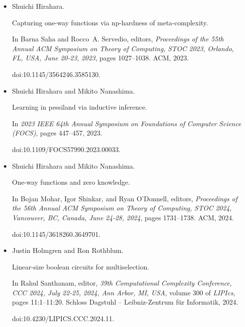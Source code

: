 \begin{itemize}
doi:10.1109/FOCS54457.2022.00095.





\item[] 
[17]

Shuichi Hirahara.


Capturing one-way functions via np-hardness of meta-complexity.


In Barna Saha and Rocco A. Servedio, editors, \emph{Proceedings of the
55th Annual ACM Symposium on Theory of Computing, STOC 2023, Orlando, FL,
USA, June 20-23, 2023}, pages 1027–1038. ACM, 2023.


doi:10.1145/3564246.3585130.





\item[] 
[18]

Shuichi Hirahara and Mikito Nanashima.


Learning in pessiland via inductive inference.


In \emph{2023 IEEE 64th Annual Symposium on Foundations of Computer
Science (FOCS)}, pages 447–457, 2023.


doi:10.1109/FOCS57990.2023.00033.





\item[] 
[19]

Shuichi Hirahara and Mikito Nanashima.


One-way functions and zero knowledge.


In Bojan Mohar, Igor Shinkar, and Ryan O’Donnell, editors, \emph{Proceedings of the 56th Annual ACM Symposium on Theory of Computing, STOC
2024, Vancouver, BC, Canada, June 24-28, 2024}, pages 1731–1738. ACM,
2024.


doi:10.1145/3618260.3649701.





\item[] 
[20]

Justin Holmgren and Ron Rothblum.


Linear-size boolean circuits for multiselection.


In Rahul Santhanam, editor, \emph{39th Computational Complexity
Conference, CCC 2024, July 22-25, 2024, Ann Arbor, MI, USA}, volume 300
of \emph{LIPIcs}, pages 11:1–11:20. Schloss Dagstuhl – Leibniz-Zentrum
für Informatik, 2024.


doi:10.4230/LIPICS.CCC.2024.11.






\end{itemize}
